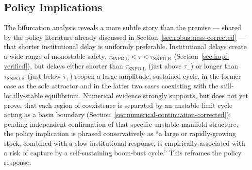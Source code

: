 \documentclass[twocolumn,10pt]{article}
\begin{document}
\subsection{Policy Implications}
\label{sec:policy-implications}
The bifurcation analysis reveals a more subtle story than the premise --- shared by the policy literature already discussed in Section~\ref{sec:robustness-corrected} \cite{hocherman2025,mckibbin2014} --- that shorter institutional delay is uniformly preferable. Institutional delays create a wide range of monostable safety, $\tau_{\text{SNPO,L}}<\tau<\tau_{\text{SNPO,R}}$ (Section~\ref{sec:hopf-verified}), but delays either shorter than $\tau_{\text{SNPO,L}}$ (just above $\tau_-$) or longer than $\tau_{\text{SNPO,R}}$ (just below $\tau_+$) reopen a large-amplitude, sustained cycle, in the former case as the sole attractor and in the latter two cases coexisting with the still-locally-stable equilibrium. Numerical evidence strongly supports, but does not yet prove, that each region of coexistence is separated by an unstable limit cycle acting as a basin boundary (Section~\ref{sec:numerical-continuation-corrected}); pending independent confirmation of that specific unstable-manifold structure, the policy implication is phrased conservatively as ``a large or rapidly-growing stock, combined with a slow institutional response, is empirically associated with a risk of capture by a self-sustaining boom-bust cycle.'' This reframes the policy response:
\end{document}

